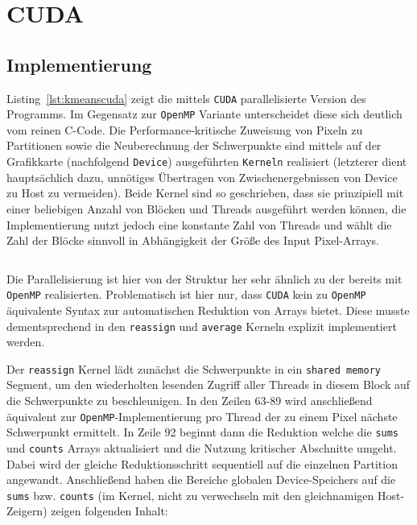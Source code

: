 \documentclass[
    bibliography=totoc, cd=lightcolor, cdmath=false, ngerman]{tudscrreprt}
\begin{document}
\section{CUDA}

\subsection{Implementierung}

Listing~\ref{lst:kmeanscuda} zeigt die mittels \texttt{CUDA} parallelisierte
Version des Programms. Im Gegensatz zur \texttt{OpenMP} Variante unterscheidet
diese sich deutlich vom reinen C-Code. Die Performance-kritische Zuweisung von
Pixeln zu Partitionen sowie die Neuberechnung der Schwerpunkte sind mittels auf
der Grafikkarte (nachfolgend \texttt{Device}) ausgeführten \texttt{Kerneln}
realisiert (letzterer dient hauptsächlich dazu, unnötiges Übertragen von
Zwischenergebnissen von Device zu Host zu vermeiden). Beide Kernel sind so
geschrieben, dass sie prinzipiell mit einer beliebigen Anzahl von Blöcken und
Threads ausgeführt werden können, die Implementierung nutzt jedoch eine
konstante Zahl von Threads und wählt die Zahl der Blöcke sinnvoll in
Abhängigkeit der Größe des Input Pixel-Arrays.

\inputminted[label=kmeanscuda]{CUDA}{c/src/kmeans.cu}

Die Parallelisierung ist hier von der Struktur her sehr ähnlich zu der bereits
mit \texttt{OpenMP} realisierten. Problematisch ist hier nur, dass
\texttt{CUDA} kein zu \texttt{OpenMP} äquivalente Syntax zur automatischen
Reduktion von Arrays bietet. Diese musste dementsprechend in
den \texttt{reassign} und \texttt{average} Kerneln explizit implementiert
werden.

Der \texttt{reassign} Kernel lädt zunächst die Schwerpunkte in ein
\texttt{shared memory} Segment, um den wiederholten lesenden Zugriff aller
Threads in diesem Block auf die Schwerpunkte zu beschleunigen. In den Zeilen
63-89 wird anschließend äquivalent zur \texttt{OpenMP}-Implementierung pro
Thread der zu einem Pixel nächste Schwerpunkt ermittelt. In Zeile 92 beginnt
dann die Reduktion welche die \texttt{sums} und \texttt{counts} Arrays
aktualisiert und die Nutzung kritischer Abschnitte umgeht. Dabei wird der
gleiche Reduktionsschritt sequentiell auf die einzelnen Partition angewandt.
Anschließend haben die Bereiche globalen Device-Speichers auf die \texttt{sums}
bzw. \texttt{counts} (im Kernel, nicht zu verwechseln mit den gleichnamigen
Host-Zeigern) zeigen folgenden Inhalt:
\end{document}
